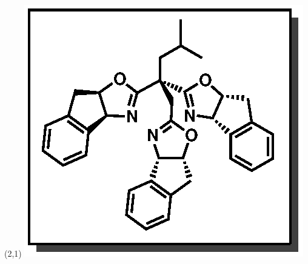 \begin{textblock}{1}(2,1)
\includegraphics[scale=0.8, angle=90]{chp_asymmetric/images/ligandah}
\end{textblock}
\clearpage

